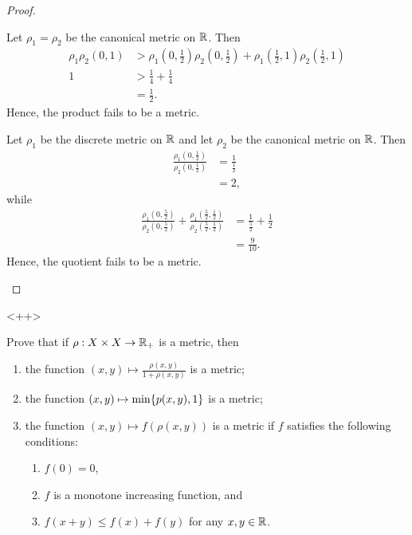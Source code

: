 \begin{proof}
\begin{enumerate}
            Let $\rho_1 = \rho_2$ be the canonical metric on $\mathbb{R}$. Then 
            \begin{align*}
                \rho_1\rho_2(0, 1) &> \rho_1(0,\tfrac{1}{2})
                \rho_2(0, \tfrac{1}{2}) + \rho_1(\tfrac{1}{2}, 1)
                \rho_2(\tfrac{1}{2}, 1) \\
                1 &> \tfrac{1}{4} + \tfrac{1}{4} \\
                &= \tfrac{1}{2}.
            \end{align*}
            Hence, the product fails to be a metric.

            Let $\rho_1$ be the discrete metric on $\mathbb{R}$ and let $\rho_2$ be the
            canonical metric on $\mathbb{R}$. Then
            \begin{align*}
                \frac{\rho_1(0,\tfrac{1}{2})}{\rho_2(0,\tfrac{1}{2})} &=
                \frac{1}{\tfrac{1}{2}} \\
                &= 2,
            \end{align*}
            while
            \begin{align*}
                \frac{\rho_1(0,\tfrac{5}{2})}{\rho_2(0,\tfrac{5}{2})} + 
                \frac{\rho_1(\tfrac{5}{2},\tfrac{1}{2})}{\rho_2(\tfrac{5}{2},\tfrac{1}{2})}
                &= \frac{1}{\tfrac{5}{2}} + \frac{1}{2} \\
                &= \frac{9}{10}.
            \end{align*}
            Hence, the quotient fails to be a metric.
    \end{enumerate}
    
\end{proof}<++>

\begin{minorEx}
    Prove that if $\rho : X \times X \to \mathbb{R}_+$ is a metric, then
    \begin{enumerate}
        \item the function $(x, y) \mapsto \frac{\rho(x,y)}{1 + \rho(x,y)}$ is a
            metric;
        \item the function $(x, y) \mapsto \min\{p(x,y), 1\}$ is a metric;
        \item the function $(x, y) \mapsto f(\rho(x,y))$ is a metric if $f$
            satisfies the following conditions:
            \begin{enumerate}
                \item $f(0) = 0$,
                \item $f$ is a monotone increasing function, and
                \item $f(x + y) \leq f(x) + f(y)$ for any $x, y \in \mathbb{R}$.
            \end{enumerate}
    \end{enumerate}
\end{minorEx}

